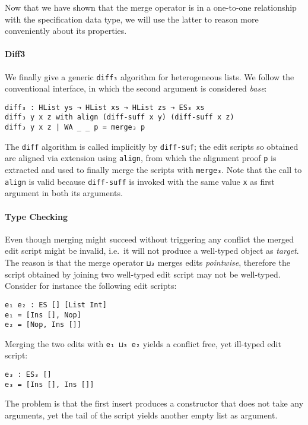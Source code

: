 \documentclass{sigplanconf}
\theoremstyle{plain}
\begin{document}
        Now that we have shown that the merge operator is in a
        one-to-one relationship with the specification data type, we
        will use the latter to reason more conveniently about its
        properties.

	\paragraph{Diff3}
	We finally give a generic \texttt{diff₃} algorithm for
        heterogeneous lists.
        We follow the conventional interface, in which the second
        argument is considered \emph{base}:
\begin{verbatim}
diff₃ : HList ys → HList xs → HList zs → ES₃ xs
diff₃ y x z with align (diff-suff x y) (diff-suff x z)
diff₃ y x z | WA _ _ p = merge₃ p
\end{verbatim}
	
	The \texttt{diff} algorithm is called implicitly by
        \texttt{diff-suf}; the edit scripts so obtained are aligned
        via extension using \texttt{align}, from which the alignment
        proof \texttt{p} is extracted and used to finally merge the
        scripts with \texttt{merge₃}.  Note that the call to
        \texttt{align} is valid because \texttt{diff-suff} is invoked
        with the same value \texttt{x} as first argument in both its
        arguments.

        \paragraph{Type Checking}
	Even though merging might succeed without triggering any
        conflict the merged edit script might be invalid, i.e.\ it will
        not produce a well-typed object as \emph{target}.
        The reason is that the merge operator \texttt{⊔₃} merges edits
        \emph{pointwise}, therefore the script obtained by joining two
        well-typed edit script may not be well-typed.  Consider for
        instance the following edit scripts:
\begin{verbatim}
e₁ e₂ : ES [] [List Int]
e₁ = [Ins [], Nop]
e₂ = [Nop, Ins []]
\end{verbatim}
        Merging the two edits with \texttt{e₁ ⊔₃ e₂} yields a conflict
        free, yet ill-typed edit script:
\begin{verbatim}
e₃ : ES₃ []
e₃ = [Ins [], Ins []]
\end{verbatim}
        The problem is that the first insert produces a constructor
        that does not take any arguments, yet the tail of the script
        yields another empty list as argument.
        
\end{document}
